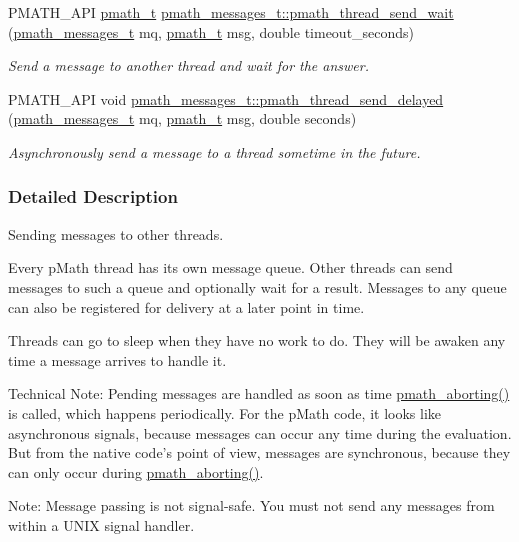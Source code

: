 \begin{CompactItemize}
PMATH\_\-API \hyperlink{classpmath__t}{pmath\_\-t} \hyperlink{group__threadmsg_g0466f7731e5e7cc3c4361f9512795a1c}{pmath\_\-messages\_\-t::pmath\_\-thread\_\-send\_\-wait} (\hyperlink{classpmath__messages__t}{pmath\_\-messages\_\-t} mq, \hyperlink{classpmath__t}{pmath\_\-t} msg, double timeout\_\-seconds)
\begin{CompactList}\small\item\em Send a message to another thread and wait for the answer. \item\end{CompactList}\item 
PMATH\_\-API void \hyperlink{group__threadmsg_g75339d9dd1902293cb72b38e77caa742}{pmath\_\-messages\_\-t::pmath\_\-thread\_\-send\_\-delayed} (\hyperlink{classpmath__messages__t}{pmath\_\-messages\_\-t} mq, \hyperlink{classpmath__t}{pmath\_\-t} msg, double seconds)
\begin{CompactList}\small\item\em Asynchronously send a message to a thread sometime in the future. \item\end{CompactList}\end{CompactItemize}


\subsubsection{Detailed Description}
Sending messages to other threads. 

Every pMath thread has its own message queue. Other threads can send messages to such a queue and optionally wait for a result. Messages to any queue can also be registered for delivery at a later point in time.

Threads can go to sleep when they have no work to do. They will be awaken any time a message arrives to handle it.

Technical Note: Pending messages are handled as soon as time \hyperlink{group__threads_gb75a9c87401fddb42b297ddb0495415f}{pmath\_\-aborting()} is called, which happens periodically. For the pMath code, it looks like asynchronous signals, because messages can occur any time during the evaluation. But from the native code's point of view, messages are synchronous, because they can only occur during \hyperlink{group__threads_gb75a9c87401fddb42b297ddb0495415f}{pmath\_\-aborting()}.

\begin{Desc}
\item[Note:]Message passing is not signal-safe. You must not send any messages from within a UNIX signal handler. \end{Desc}


